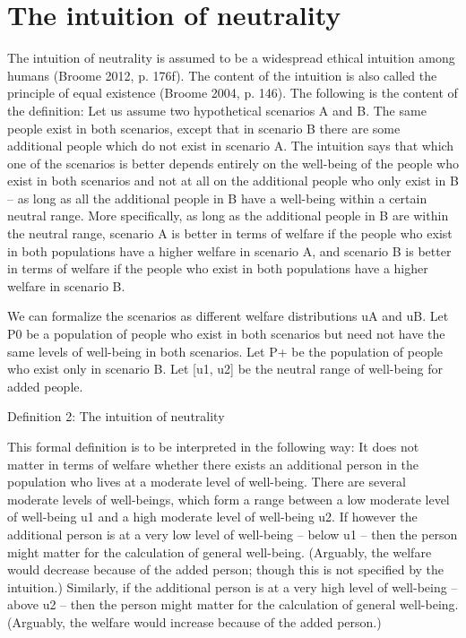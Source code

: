 \section{The intuition of neutrality}

The intuition of neutrality is assumed to be a widespread ethical intuition among humans (\label{ref:RND5BNnNe71j8}Broome 2012, p. 176f). The content of the intuition is also called the principle of equal existence (\label{ref:RNDaWHBLx2kgv}Broome 2004, p. 146). The following is the content of the definition: Let us assume two hypothetical scenarios A and B. The same people exist in both scenarios, except that in scenario B there are some additional people which do not exist in scenario A. The intuition says that which one of the scenarios is better depends entirely on the well-being of the people who exist in both scenarios and not at all on the additional people who only exist in B – as long as all the additional people in B have a well-being within a certain neutral range. More specifically, as long as the additional people in B are within the neutral range, scenario A is better in terms of welfare if the people who exist in both populations have a higher welfare in scenario A, and scenario B is better in terms of welfare if the people who exist in both populations have a higher welfare in scenario B.  

We can formalize the scenarios as different welfare distributions uA and uB. Let P0 be a population of people who exist in both scenarios but need not have the same levels of well-being in both scenarios. Let P+ be the population of people who exist only in scenario B. Let [u1, u2] be the neutral range of well-being for added people.  

Definition 2: The intuition of neutrality 
\begin{comment}
${\exists}$u1, u2: ( ${\forall}$ x ${\in}$ P+ : uB(x) ${\in}$ [u1, u2] ) \ding{213} 

( uB(P0) {\textgreater} uA(P0) \ \ \ding{213} \ \ uB(P0 ${\cup}$ P+) {\textgreater} uA(P0) ) ${\wedge}$  

( uB(P0) {\textless} uA(P0) \ \ \ding{213} \ \ uB(P0 ${\cup}$ P+) {\textless} uA(P0) )  
\end{comment}

This formal definition is to be interpreted in the following way: It does not matter in terms of welfare whether there exists an additional person in the population who lives at a moderate level of well-being. There are several moderate levels of well-beings, which form a range between a low moderate level of well-being u1 and a high moderate level of well-being u2. If however the additional person is at a very low level of well-being – below u1 – then the person might matter for the calculation of general well-being. (Arguably, the welfare would decrease because of the added person; though this is not specified by the intuition.) Similarly, if the additional person is at a very high level of well-being – above u2 – then the person might matter for the calculation of general well-being. (Arguably, the welfare would increase because of the added person.) 

